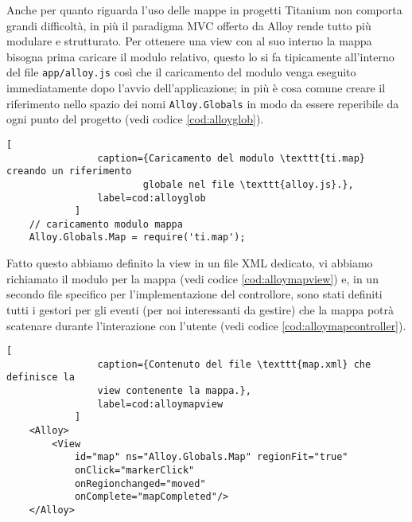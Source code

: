             Anche per quanto riguarda l'uso delle mappe in progetti Titanium
            non comporta grandi difficoltà, in più il paradigma MVC
            offerto da Alloy rende tutto più modulare e strutturato. Per ottenere
            una view con al suo interno la mappa bisogna prima caricare il modulo
            relativo, questo lo si fa tipicamente all'interno del file
            \texttt{app/alloy.js} così che il caricamento del modulo venga
            eseguito immediatamente dopo l'avvio dell'applicazione; in più è cosa
            comune creare il riferimento nello spazio dei nomi \texttt{Alloy.Globals}
            in modo da essere reperibile da ogni punto del progetto (vedi codice \ref{cod:alloyglob}).
            \begin{lstlisting}[
                caption={Caricamento del modulo \texttt{ti.map} creando un riferimento
                        globale nel file \texttt{alloy.js}.},
                label=cod:alloyglob
            ]
    // caricamento modulo mappa
    Alloy.Globals.Map = require('ti.map');
            \end{lstlisting}
            Fatto questo abbiamo definito la view in un file XML dedicato, vi abbiamo richiamato
            il modulo per la mappa (vedi codice \ref{cod:alloymapview}) e, in un secondo file \js{} specifico per
            l'implementazione del controllore, sono stati definiti tutti i
            gestori per gli eventi (per noi interessanti da gestire) che la
            mappa potrà scatenare durante l'interazione con l'utente (vedi codice \ref{cod:alloymapcontroller}).
            \begin{lstlisting}[
                caption={Contenuto del file \texttt{map.xml} che definisce la
                view contenente la mappa.},
                label=cod:alloymapview
            ]
    <Alloy>
        <View
            id="map" ns="Alloy.Globals.Map" regionFit="true"
            onClick="markerClick"
            onRegionchanged="moved"
            onComplete="mapCompleted"/>
    </Alloy>
            \end{lstlisting}
